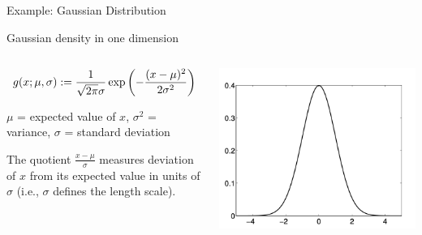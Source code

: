 \documentclass[10pt]{beamer}
\begin{document}
\begin{frame}{Example: Gaussian Distribution}

\begin{sblock}{Gaussian density in one dimension}
\begin{columns}
\begin{column}{.55\textwidth}
\footnotesize
\[ g(x; \mu, \sigma) := \displaystyle\frac{1}{\sqrt{2 \pi} \sigma} \exp \bigg( { - \displaystyle\frac{(x-\mu)^2}{2 \sigma^2}} \bigg) \]
\begin{compactitem}
\item $\mu$ = expected value of $x$, $\sigma^2$ = variance, $\sigma$ =  standard deviation
\item The quotient $\frac{x - \mu}{\sigma}$ measures deviation of $x$ from its expected value in units of $\sigma$ (i.e., $\sigma$ defines the length scale).
\end{compactitem}
\end{column}
\begin{column}{.3\textwidth}
\includegraphics[width=\textwidth]{images/gaussian_1d}
\end{column}
\end{columns}
\end{sblock}


\end{frame}
\end{document}

